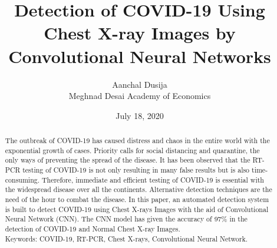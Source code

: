 \documentclass[12pt]{revtex4}
\begin{document}
\linespread{1.5}
\title{ Detection of COVID-19 Using Chest X-ray Images by Convolutional Neural Networks}
\author{Aanchal Dusija \\ Meghnad Desai Academy of Economics}
\date{July 18, 2020}

\begin{abstract}
The outbreak of COVID-19 has caused distress and chaos in the entire world with the exponential growth of cases. Priority calls for social distancing and quarantine, the only ways of preventing the spread of the disease. It has been observed that the RT-PCR testing of COVID-19 is not only resulting in many false results but is also time-consuming. Therefore, immediate and efficient testing of COVID-19 is essential with the widespread disease over all the continents. Alternative detection techniques are the need of the hour to combat the disease. In this paper, an automated detection system is built to detect COVID-19 using Chest X-rays Images with the aid of Convolutional Neural Network (CNN). The CNN model has given the accuracy of 97\% in the detection of COVID-19 and Normal Chest X-ray Images. 
\\Keywords: COVID-19, RT-PCR, Chest X-rays, Convolutional Neural Network. 
\end{abstract}

\maketitle

\pagebreak
\end{document}
